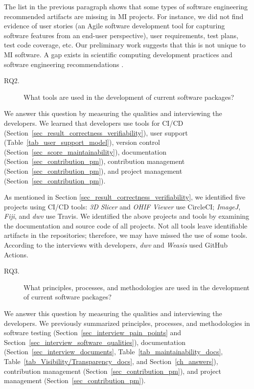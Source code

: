\documentclass[final, 3p, times, authoryear]{elsarticle}
\begin{document}
The list in the previous paragraph shows that some types of software engineering
recommended artifacts are missing in MI projects.  For instance, we did not find
evidence of user stories (an Agile software development tool for capturing
software features from an end-user perspective), user requirements, test plans,
test code coverage, etc.  Our preliminary work suggests that this is not unique
to MI software.  A gap exists in scientific computing development practices and
software engineering recommendations \citep{OwojaiyeEtAl2021_CSE}.

\begin{description}
\item[RQ2.] What tools are used in the development of current software packages?
\end{description}

We answer this question by measuring the qualities and interviewing the
developers. We learned that developers use tools for CI/CD
(Section~\ref{sec_result_correctness_verifiability}), user support
(Table~\ref{tab_user_support_model}), version control
(Section~\ref{sec_score_maintainability}), documentation
(Section~\ref{sec_contribution_pm}), contribution management
(Section~\ref{sec_contribution_pm}), and project management
(Section~\ref{sec_contribution_pm}).

As mentioned in Section \ref{sec_result_correctness_verifiability}, we
identified five projects using CI/CD tools: \textit{3D Slicer} and \textit{OHIF
Viewer} use CircleCI; \textit{ImageJ}, \textit{Fiji}, and \textit{dwv} use
Travis. We identified the above projects and tools by examining the
documentation and source code of all projects. Not all tools leave identifiable
artifacts in the repositories; therefore, we may have missed the use of some
tools. According to the interviews with developers, \textit{dwv} and
\textit{Weasis} used GitHub Actions.

\begin{description}
\item[RQ3.] What principles, processes, and methodologies are used in the
development of current software packages?
\end{description}

We answer this question by measuring the qualities and interviewing the
developers. We previously summarized principles, processes, and methodologies in
software testing (Section~\ref{sec_interview_pain_points} and
Section~\ref{sec_interview_software_qualities}), documentation
(Section~\ref{sec_interview_documents}, Table~\ref{tab_maintainability_docs},
Table~\ref{tab_Visibility/Transparency_docs}, and Section~\ref{ch_answers}),
contribution management (Section~\ref{sec_contribution_pm}), and project
management (Section~\ref{sec_contribution_pm}). 
\end{document}

